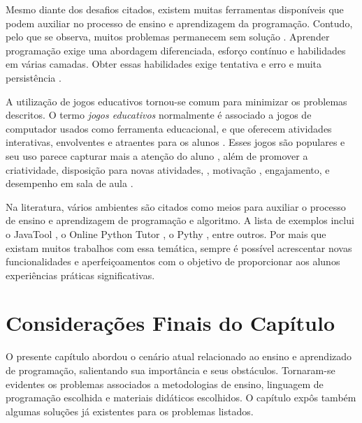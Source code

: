 Mesmo diante dos desafios citados, existem muitas ferramentas disponíveis que podem auxiliar no processo de ensino e aprendizagem da programação. Contudo, pelo que se observa, muitos problemas permanecem sem solução \cite{bossegerosa2017, gomesmendes2007, robins2019, savagepiwek2019}. Aprender programação exige uma abordagem diferenciada, esforço contínuo e habilidades em várias camadas. Obter essas habilidades exige tentativa e erro e muita persistência \cite{jiauchenssu2009}.
	
A utilização de jogos educativos tornou-se comum para minimizar os problemas descritos. O termo \emph{jogos educativos} normalmente é associado a jogos de computador usados como ferramenta educacional, e que oferecem atividades interativas, envolventes e atraentes para os alunos \cite{gunterkennyvick2007}.  Esses jogos são populares e seu uso parece capturar mais a atenção do aluno \cite{barnesetall2007}, além de promover a criatividade, disposição para novas atividades, \cite{kellygibson2006}, motivação \cite{freitasjavris2006}, engajamento, e desempenho em sala de aula \cite{chaffinetall2009}.
	
Na literatura, vários ambientes são citados como meios para auxiliar o processo de ensino e aprendizagem de programação e algoritmo. A lista de exemplos inclui o JavaTool \cite{mota2008}, o Online Python Tutor \cite{guo2013}, o Pythy \cite{edwardsetall2013}, entre outros. Por mais que existam muitos trabalhos com essa temática, sempre é possível acrescentar novas funcionalidades e aperfeiçoamentos com o objetivo de proporcionar aos alunos experiências práticas significativas.

\section{Considerações Finais do Capítulo}
O presente capítulo abordou o cenário atual relacionado ao ensino e aprendizado de programação, salientando
sua importância e seus obstáculos. Tornaram-se evidentes os problemas associados a metodologias de ensino, linguagem de programação escolhida e materiais didáticos escolhidos. O capítulo expôs também algumas soluções já existentes para os problemas listados.
